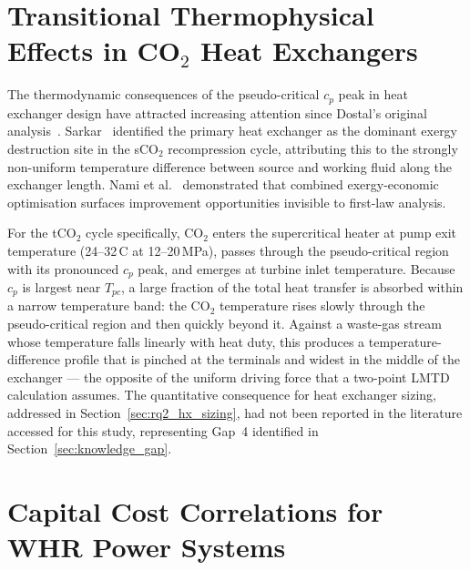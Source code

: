 \documentclass[12pt,a4paper]{report}
\begin{document}
\section{Transitional Thermophysical Effects in CO$_2$ Heat Exchangers}
\label{sec:lit_transitional}

The thermodynamic consequences of the pseudo-critical $c_p$ peak in heat
exchanger design have attracted increasing attention since Dostal's original
analysis~\cite{Dostal2004}. Sarkar~\cite{Sarkar2009} identified the primary
heat exchanger as the dominant exergy destruction site in the sCO$_2$
recompression cycle, attributing this to the strongly non-uniform temperature
difference between source and working fluid along the exchanger length. Nami
et al.~\cite{Nami2017} demonstrated that combined exergy-economic optimisation
surfaces improvement opportunities invisible to first-law analysis.

For the tCO$_2$ cycle specifically, CO$_2$ enters the supercritical heater at
pump exit temperature (24--32\,\textdegree C at 12--20\,MPa), passes through
the pseudo-critical region with its pronounced $c_p$ peak, and emerges at
turbine inlet temperature. Because $c_p$ is largest near $T_{pc}$, a large
fraction of the total heat transfer is absorbed within a narrow temperature
band: the CO$_2$ temperature rises slowly through the pseudo-critical region
and then quickly beyond it. Against a waste-gas stream whose temperature falls
linearly with heat duty, this produces a temperature-difference profile that
is pinched at the terminals and widest in the middle of the exchanger --- the
opposite of the uniform driving force that a two-point LMTD calculation
assumes. The quantitative consequence for heat exchanger sizing, addressed in
Section~\ref{sec:rq2_hx_sizing}, had not been reported in the literature
accessed for this study, representing Gap~4 identified in
Section~\ref{sec:knowledge_gap}.

\section{Capital Cost Correlations for WHR Power Systems}
\label{sec:lit_cost}
\end{document}
